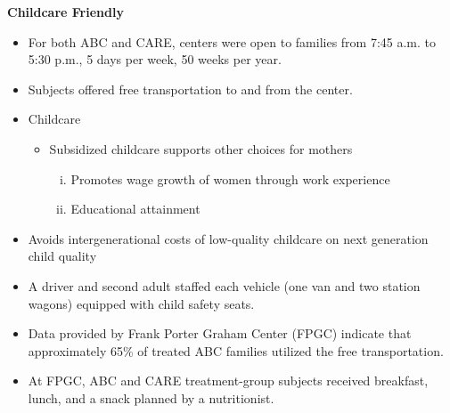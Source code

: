 \documentclass[static]{JJH-Beamer}
\begin{document}
\begin{frame}

\begin{center}
\textbf{Childcare Friendly}
\end{center}
\begin{itemize}
\item For both ABC and CARE, centers were open to families from 7:45 a.m. to 5:30 p.m., 5 days per week, 50 weeks per year.
\item Subjects offered free transportation to and from the center.
\end{itemize}

\end{frame}

\begin{frame}

\begin{itemize}
\item Childcare
    \begin{itemize}
    \item Subsidized childcare supports other choices for mothers
        \begin{enumerate}[(i)]
        \item Promotes wage growth of women through work experience
        \item Educational attainment
        \end{enumerate}
    \end{itemize}
\item Avoids intergenerational costs of low-quality childcare on next generation child quality
\end{itemize}

\end{frame}


\begin{itemize}
\item A driver and second adult staffed each vehicle (one van and two station wagons) equipped with child safety seats.
\item Data provided by Frank Porter Graham Center (FPGC) indicate that approximately 65\% of treated ABC families utilized the free transportation.
\item At FPGC, ABC and CARE treatment-group subjects received breakfast, lunch, and a snack planned by a nutritionist.
\end{itemize}
\end{document}
